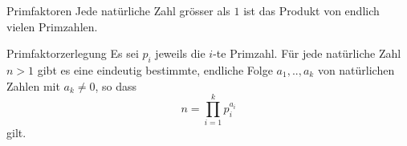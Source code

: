 %
%



\begin{theorem}{Primfaktoren}
 Jede natürliche Zahl grösser als $1$ ist das Produkt von endlich vielen Primzahlen.
\end{theorem}


\begin{theorem}{Primfaktorzerlegung}
Es sei $p_i$ jeweils die $i$-te Primzahl. Für jede natürliche Zahl $n>1$ gibt es eine eindeutig bestimmte, endliche Folge $a_1,..,a_k$ von natürlichen Zahlen mit $a_k\neq 0$, so dass
\[
 n=\prod_{i=1}^k p_i^{a_i}
\]
gilt.
\end{theorem}
